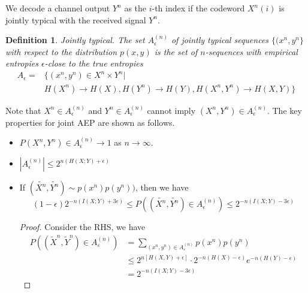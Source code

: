 \documentclass[10pt,landscape, a4paper]{article}
\newtheorem{definition}{Definition}
\begin{document}
\begin{multicols}{3}
We decode a channel output $Y^n$ as the $i$-th index if the codeword $X^n(i)$ is jointly typical with the received signal $Y^n$. 

\begin{definition}
    Jointly typical. The set $A_\epsilon^{(n)}$ of jointly typical sequences $\{(x^n,y^n\}$ with respect to the distribution $p(x,y)$ is the set of $n$-sequences with empirical entropies $\epsilon$-close to the true entropies
    $$
    \begin{aligned}
        A_\epsilon=&\{(x^n,y^n)\in X^n\times Y^n|\\
        &H(X^n)\rightarrow H(X), H(Y^n)\rightarrow H(Y),H(X^n,Y^n)\rightarrow H(X,Y)\}
    \end{aligned}
    $$
\end{definition}

Note that $X^n\in A_\epsilon^{(n)}$ and $Y^n\in A_\epsilon^{(n)}$ cannot imply $(X^n,Y^n)\in A_\epsilon^{(n)}$. The key properties for joint AEP are shown as follows.
\begin{itemize}
    \item $P(X^n, Y^n)\in A_{\epsilon}^{(n)}\rightarrow 1$ as $n\rightarrow \infty$.
    \item $|A_\epsilon^{(n)}|\le 2^{n(H(X;Y)+\epsilon)}$
    \item If $(\tilde{X^n},\tilde{Y^n})\sim p(x^n)p(y^n))$, then we have
    $$
    (1-\epsilon)2^{-n(I(X;Y)+3\epsilon)}\le P((\tilde{X^n},\tilde{Y^n})\in A_\epsilon^{(n)})\le 2^{-n(I(X;Y)-3\epsilon)}
    $$
    \begin{proof}
        Consider the RHS, we have
        $$
        \begin{aligned}
            P((\tilde{X}^n, \tilde{Y}^n)\in A_{\varepsilon}^{(n)})&=\sum_{(x^n, y^n)\in A_\varepsilon^{(n)}}p(x^n)p(y^n)\\
            &\le 2^{n[H(X,Y)+\epsilon]}\cdot 2^{-n(H(X)-\epsilon)}e^{-n(H(Y)-\epsilon)}\\
            &=2^{-n(I(X;Y)-3\epsilon)}  
        \end{aligned}
        $$
    \end{proof}
\end{itemize}


\end{multicols}
\end{document}
